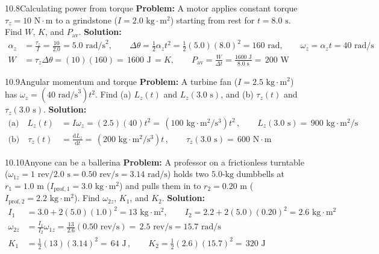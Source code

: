 \documentclass[11pt,a4paper,openany,oneside]{book}
\newcommand{\eqbox}[1]{\boxed{\,#1\,}}
\newcommand{\diff}{\mathrm{d}}
\numberwithin{equation}{chapter}
\newcommand{\bk}[1]{\texorpdfstring{\enspace{\normalfont\small\color{slate}[Book #1]}}{ [Book #1]}}
\begin{document}
\begin{example}{10.8}{Calculating power from torque\bk{p.\ 322}}
\textbf{Problem:} A motor applies constant torque $\tau_z = 10\text{ N}\cdot\text{m}$ to a grindstone ($I = 2.0\text{ kg}\cdot\text{m}^2$) starting from rest for $t = 8.0\text{ s}$. Find $W$, $K$, and $P_{\text{av}}$.
\tcblower
\textbf{Solution:}
\begin{align*}
  \alpha_z &= \frac{\tau_z}{I} = \frac{10}{2.0} = 5.0\text{ rad/s}^2, \qquad \Delta\theta = \frac{1}{2}\alpha_z t^2 = \frac{1}{2}(5.0)(8.0)^2 = 160\text{ rad}, \qquad \omega_z = \alpha_z t = 40\text{ rad/s}\\
  W &= \tau_z\Delta\theta = (10)(160) = \eqbox{1600\text{ J}} = K, \qquad P_{\text{av}} = \frac{W}{\Delta t} = \frac{1600\text{ J}}{8.0\text{ s}} = \eqbox{200\text{ W}}
\end{align*}
\end{example}

\begin{example}{10.9}{Angular momentum and torque\bk{p.\ 324}}
\textbf{Problem:} A turbine fan ($I = 2.5\text{ kg}\cdot\text{m}^2$) has $\omega_z = (40\text{ rad/s}^3)t^2$. Find (a) $L_z(t)$ and $L_z(3.0\text{ s})$, and (b) $\tau_z(t)$ and $\tau_z(3.0\text{ s})$.
\tcblower
\textbf{Solution:}
\begin{align*}
  \text{(a)}\quad L_z(t) &= I\omega_z = (2.5)(40)t^2 = \eqbox{(100\text{ kg}\cdot\text{m}^2/\text{s}^3)t^2}, \qquad L_z(3.0\text{ s}) = \eqbox{900\text{ kg}\cdot\text{m}^2/\text{s}}\\
  \text{(b)}\quad \tau_z(t) &= \frac{\diff L_z}{\diff t} = \eqbox{(200\text{ kg}\cdot\text{m}^2/\text{s}^3)t}, \qquad \tau_z(3.0\text{ s}) = \eqbox{600\text{ N}\cdot\text{m}}
\end{align*}
\end{example}

\begin{example}{10.10}{Anyone can be a ballerina\bk{p.\ 326}}
\textbf{Problem:} A professor on a frictionless turntable ($\omega_{1z} = 1\text{ rev}/2.0\text{ s} = 0.50\text{ rev/s} = 3.14\text{ rad/s}$) holds two $5.0\text{-kg}$ dumbbells at $r_1 = 1.0\text{ m}$ ($I_{\text{prof},1} = 3.0\text{ kg}\cdot\text{m}^2$) and pulls them in to $r_2 = 0.20\text{ m}$ ($I_{\text{prof},2} = 2.2\text{ kg}\cdot\text{m}^2$). Find $\omega_{2z}$, $K_1$, and $K_2$.
\tcblower
\textbf{Solution:}
\begin{align*}
  I_1 &= 3.0 + 2(5.0)(1.0)^2 = 13\text{ kg}\cdot\text{m}^2, \qquad I_2 = 2.2 + 2(5.0)(0.20)^2 = 2.6\text{ kg}\cdot\text{m}^2\\
  \omega_{2z} &= \frac{I_1}{I_2}\omega_{1z} = \frac{13}{2.6}(0.50\text{ rev/s}) = \eqbox{2.5\text{ rev/s} = 15.7\text{ rad/s}}\\
  K_1 &= \frac{1}{2}(13)(3.14)^2 = \eqbox{64\text{ J}}, \qquad K_2 = \frac{1}{2}(2.6)(15.7)^2 = \eqbox{320\text{ J}}
\end{align*}
\end{example}
\end{document}

